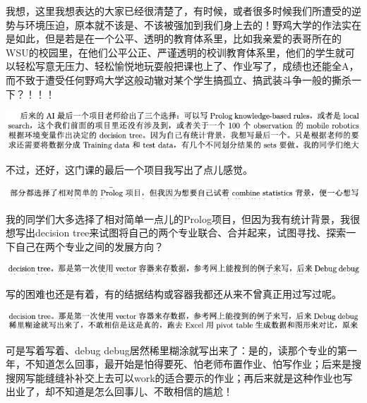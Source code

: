 \documentclass[9pt, b5paper]{article}
\begin{document}
我想，这里我想表达的大家已经很清楚了，有时候，或者很多时候我们所遭受的逆势与环境压迫，原本就不该是、不该被强加到我们身上去的！野鸡大学的作法实在是如此，但是若是在一个公平、透明的教育体系里，比如我亲爱的表哥所在的WSU的校园里，在他们公平公正、严谨透明的校训教育体系里，他们的学生就可以轻松写意无压力、轻松愉悦地玩耍般把课也上了、作业写了，成绩也还能全A，而不致于遭受任何野鸡大学这般动辙对某个学生搞孤立、搞武装斗争一般的撕杀一下？！！！

\begin{center}
\includegraphics[width=.9\linewidth]{./pic/backups_plans_20210504_114719.png}
\end{center}

不过，还好，这门课的最后一个项目我写出了点儿感觉。 

\begin{center}
\includegraphics[width=.9\linewidth]{./pic/backups_plans_20210504_114917.png}
\end{center}

我的同学们大多选择了相对简单一点儿的Prolog项目，但因为我有统计背景，我很想写出decision tree来试图将自己的两个专业联合、合并起来，试图寻找、探索一下自己在两个专业之间的发展方向？

\begin{center}
\includegraphics[width=.9\linewidth]{./pic/backups_plans_20210504_115018.png}
\end{center}

写的困难也还是有着，有的结据结构或容器我都还从来不曾真正用过写过呢。 

\begin{center}
\includegraphics[width=.9\linewidth]{./pic/backups_plans_20210504_115241.png}
\end{center}

可是写着写着、debug debug居然稀里糊涂就写出来了：是的，读那个专业的第一年，不知道怎么回事，最开始是怕得要死、怕老师布置作业、怕写作业；后来是搜搜网写能缝缝补补交上去可以work的适合要示的作业；再后来就是这种作业也写出业了，却不知道是怎么回事儿、不敢相信的尴尬！
\end{document}
